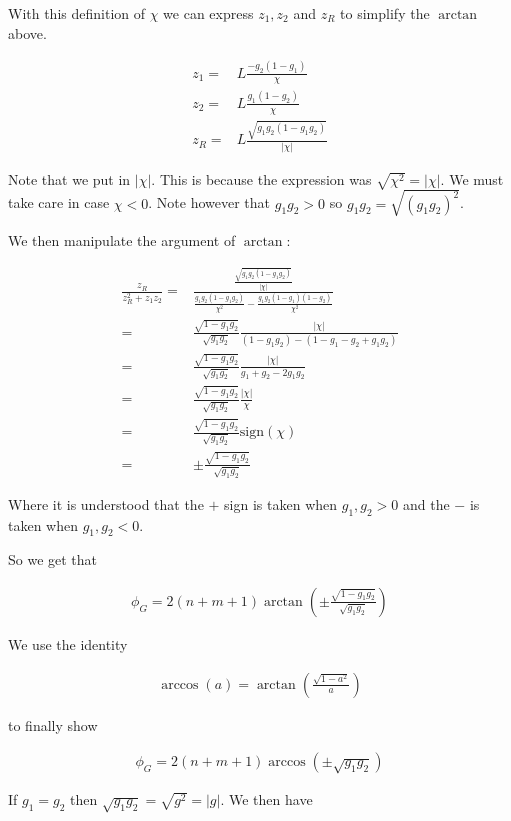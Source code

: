 \documentclass[12pt]{article}
\begin{document}
With this definition of $\chi$ we can express $z_1, z_2$ and $z_R$ to simplify the $\arctan$ above.

\begin{align}
z_1 =& L \frac{-g_2(1-g_1)}{\chi}\\
z_2 =& L \frac{g_1(1-g_2)}{\chi}\\
z_R =& L\frac{\sqrt{g_1g_2(1-g_1g_2)}}{|\chi|}
\end{align}

Note that we put in $|\chi|$.
This is because the expression was $\sqrt{\chi^2} = |\chi|$.
We must take care in case $\chi<0$.
Note however that $g_1g_2 >0$ so $g_1g_2 = \sqrt{(g_1g_2)^2}$.

We then manipulate the argument of $\arctan$:

\begin{align}
\frac{z_R}{z_R^2 + z_1z_2} =& \frac{\frac{\sqrt{g_1 g_2(1-g_1g_2)}}{|\chi|}}{\frac{g_1g_2(1-g_1g_2)}{\chi^2} - \frac{g_1g_2(1-g_1)(1-g_2)}{\chi^2}}\\
=& \frac{\sqrt{1-g_1g_2}}{\sqrt{g_1g_2}} \frac{|\chi|}{(1-g_1g_2) - (1 - g_1 - g_2 + g_1 g_2)}\\
=& \frac{\sqrt{1-g_1g_2}}{\sqrt{g_1g_2}} \frac{|\chi|}{g_1 + g_2 - 2 g_1g_2}\\
=& \frac{\sqrt{1-g_1g_2}}{\sqrt{g_1g_2}} \frac{|\chi|}{\chi}\\
=& \frac{\sqrt{1-g_1g_2}}{\sqrt{g_1g_2}} \text{sign}(\chi)\\
=& \pm \frac{\sqrt{1-g_1g_2}}{\sqrt{g_1g_2}} 
\end{align}

Where it is understood that the $+$ sign is taken when $g_1,g_2>0$ and the $-$ is taken when $g_1,g_2<0$.

So we get that

\begin{align}
\phi_G = 2(n+m+1)\arctan\left(\pm \frac{\sqrt{1-g_1g_2}}{\sqrt{g_1g_2}}\right)
\end{align}

We use the identity

\begin{align}
\arccos(a) = \arctan\left(\frac{\sqrt{1-a^2}}{a}\right)
\end{align}

to finally show

\begin{align}
\phi_G = 2(n+m+1)\arccos\left(\pm\sqrt{g_1g_2}\right)
\end{align}

If $g_1=g_2$ then $\sqrt{g_1g_2} = \sqrt{g^2}=|g|$.
We then have
\end{document}

